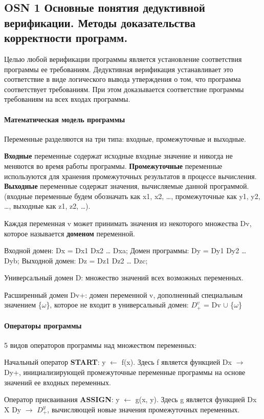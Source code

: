 \subsection{OSN 1 Основные понятия дедуктивной верификации. Методы доказательства
корректности программ.}

Целью любой верификации программы является установление соответствия программы ее требованиям. Дедуктивная верификация устанавливает это соответствие в виде логического вывода утверждения о том, что программа соответствует требованиям. При этом доказывается соответствие программы требованиям на всех входах программы.
\paragraph{Математическая модель программы}

Переменные разделяются на три типа: входные, промежуточные и выходные.

\textbf{Входные} переменные содержат исходные входные значение и никогда не меняются во время работы программы. \textbf{Промежуточные} переменные используются для хранения промежуточных результатов в процессе вычисления. \textbf{Выходные} переменные содержат значения, вычисляемые данной программой.(входные переменные будем обозначать как x1, x2, …, промежуточные как y1, y2, …, выходные как z1, z2, …).

Каждая переменная v может принимать значения из некоторого множества Dv, которое называется \textbf{доменом} переменной.

Входной домен: Dx = Dx1  Dx2  …  Dxa; Домен программы: Dy = Dy1  Dy2  …  Dyb; Выходной домен: Dz = Dz1  Dz2  …  Dzc; 

Универсальный домен D: множество значений всех возможных переменных.

Расширенный домен Dv+: домен переменной v, дополненный специальным значением \{$\omega$\}, которое не входит в универсальный домен: $D^v_+$ = Dv $\cup$ \{$\omega$\}

\paragraph{Операторы программы}
5 видов операторов программы над множеством переменных:

Начальный оператор \textbf{START}: y $\leftarrow$  f(x). Здесь f является функцией Dx $\rightarrow$ Dy+, инициализирующей промежуточные переменные программы на основе значений ее входных переменных.

Оператор присваивания \textbf{ASSIGN}: y $\leftarrow$ g(x, y). Здесь g является функцией                 Dx X Dy $\rightarrow$ $D^y_+$, вычисляющей новые значения промежуточных переменных.

